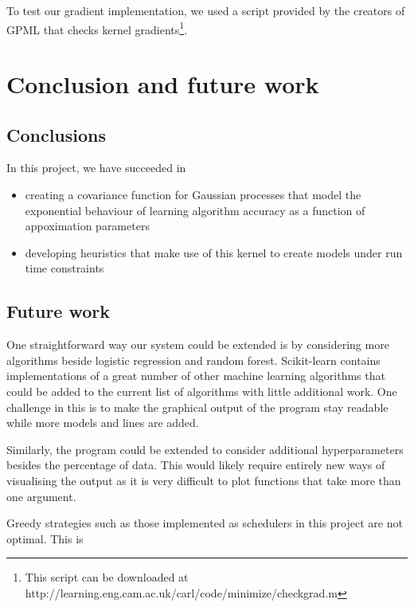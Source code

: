\documentclass[a4paper,12pt,twoside,openright]{report}
\begin{document}
To test our gradient implementation, we used a script provided by the creators of GPML that checks kernel gradients\footnote{This script can be downloaded at http://learning.eng.cam.ac.uk/carl/code/minimize/checkgrad.m}.



\chapter{Conclusion and future work} 
\section{Conclusions}
In this project, we have succeeded in
\begin{itemize}
	\item creating a covariance function for Gaussian processes that model the exponential behaviour of learning algorithm accuracy as a function of appoximation parameters
	\item developing heuristics that make use of this kernel to create models under run time constraints
\end{itemize}


\section{Future work}
One straightforward way our system could be extended is by considering more algorithms beside logistic regression and random forest. Scikit-learn contains implementations of a great number of other machine learning algorithms that could be added to the current list of algorithms with little additional work. One challenge in this is to make the graphical output of the program stay readable while more models and lines are added.

Similarly, the program could be extended to consider additional hyperparameters besides the percentage of data. This would likely require entirely new ways of visualising the output as it is very difficult to plot functions that take more than one argument.

Greedy strategies such as those implemented as schedulers in this project are not optimal. This is 





\appendix
\singlespacing

 

\end{document}

